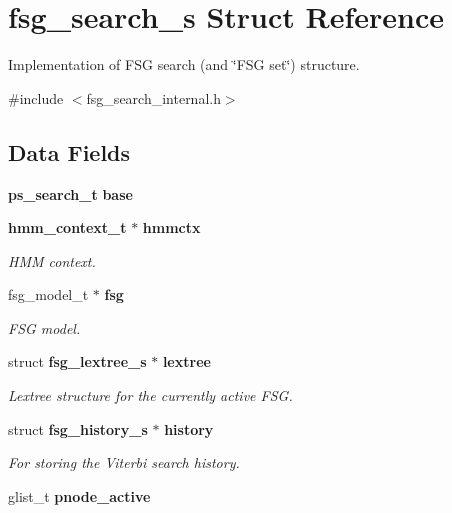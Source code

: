 \section{fsg\-\_\-search\-\_\-s Struct Reference}
\label{structfsg__search__s}


Implementation of F\-S\-G search (and \char`\"{}\-F\-S\-G set\char`\"{}) structure.  




{\ttfamily \#include $<$fsg\-\_\-search\-\_\-internal.\-h$>$}

\subsection*{Data Fields}
\begin{DoxyCompactItemize}
\item 
{\bf ps\-\_\-search\-\_\-t} {\bfseries base}\label{structfsg__search__s_a75f0e3fd5396d62616b9f84eab7ea355}

\item 
{\bf hmm\-\_\-context\-\_\-t} $\ast$ {\bf hmmctx}
\begin{DoxyCompactList}\small\item\em H\-M\-M context. \end{DoxyCompactList}\item 
fsg\-\_\-model\-\_\-t $\ast$ {\bf fsg}\label{structfsg__search__s_ab1877ffe7d77ddb79bab53fb95577946}

\begin{DoxyCompactList}\small\item\em F\-S\-G model. \end{DoxyCompactList}\item 
struct {\bf fsg\-\_\-lextree\-\_\-s} $\ast$ {\bf lextree}\label{structfsg__search__s_ac2c756ff6c1a2f1059011756d22441f8}

\begin{DoxyCompactList}\small\item\em Lextree structure for the currently active F\-S\-G. \end{DoxyCompactList}\item 
struct {\bf fsg\-\_\-history\-\_\-s} $\ast$ {\bf history}\label{structfsg__search__s_abc949ccaab380bcf5b452d1cac54469b}

\begin{DoxyCompactList}\small\item\em For storing the Viterbi search history. \end{DoxyCompactList}\item 
glist\-\_\-t {\bf pnode\-\_\-active}\label{structfsg__search__s_a318ff42978c1e645f01962345ac08215}


\end{DoxyCompactItemize}
